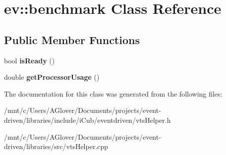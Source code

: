 \hypertarget{classev_1_1benchmark}{}\section{ev\+:\+:benchmark Class Reference}
\label{classev_1_1benchmark}
\subsection*{Public Member Functions}
\begin{DoxyCompactItemize}
\item 
\mbox{\label{classev_1_1benchmark_a10722bcfcf5df8e34fc2f17e0247290f}} 
bool {\bfseries is\+Ready} ()
\item 
\mbox{\label{classev_1_1benchmark_a23509b8f8895bafdb36e8bccfc14f82b}} 
double {\bfseries get\+Processor\+Usage} ()
\end{DoxyCompactItemize}


The documentation for this class was generated from the following files\+:\begin{DoxyCompactItemize}
\item 
/mnt/c/\+Users/\+A\+Glover/\+Documents/projects/event-\/driven/libraries/include/i\+Cub/eventdriven/vts\+Helper.\+h\item 
/mnt/c/\+Users/\+A\+Glover/\+Documents/projects/event-\/driven/libraries/src/vts\+Helper.\+cpp\end{DoxyCompactItemize}
